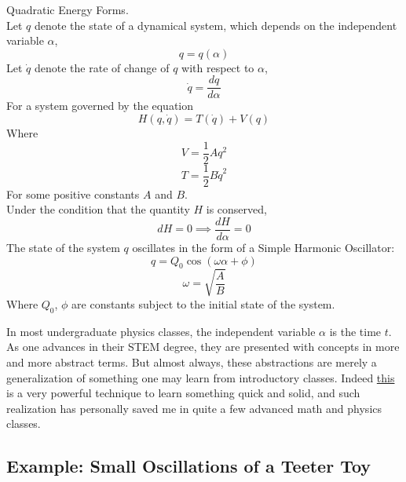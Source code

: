 \documentclass[11pt]{article}
\theoremstyle{gangnamstyle}{\newtheorem{definition}{Definition}[]}
\theoremstyle{gangnamstyle}{\newtheorem{example}{Example}[]}
\theoremstyle{gangnamstyle}{\newtheorem{problem}{Problem}[]}
\theoremstyle{gangnamstyle}{\newtheorem{warning}{Warning}[]}
\begin{document}
\begin{definition}
Quadratic Energy Forms. \\
Let $q$ denote the state of a dynamical system, which depends on the independent variable $\alpha$, 
\begin{equation}
q = q(\alpha)
\end{equation}
Let $\Dot{q}$ denote the rate of change of $q$ with respect to $\alpha$,
\begin{equation}
\Dot{q} = \frac{dq}{d\alpha}
\end{equation}
For a system governed by the equation
\begin{equation}
H(q, \Dot{q}) = T(\Dot{q}) + V(q)
\end{equation}
Where
\begin{equation}
V = \frac{1}{2} Aq^2
\end{equation}
\begin{equation}
T = \frac{1}{2} B\Dot{q}^2
\end{equation}
For some positive constants $A$ and $B$. \\
Under the condition that the quantity $H$ is conserved, 
\begin{equation}
dH = 0 \implies \frac{dH}{d\alpha} = 0
\end{equation}
The state of the system $q$ oscillates in the form of a Simple Harmonic Oscillator: 
\begin{equation}
q = Q_0\cos(\omega \alpha + \phi)
\end{equation}
\begin{equation}
\omega = \sqrt{\frac{A}{B}}
\end{equation}
Where $Q_0$, $\phi$ are constants subject to the initial state of the system.
\end{definition}
In most undergraduate physics classes, the independent variable $\alpha$ is the time $t$. \\
As one advances in their STEM degree, they are presented with concepts in more and more abstract terms. But almost always, these abstractions are merely a generalization of something one may learn from introductory classes. Indeed \href{https://lsa.umich.edu/technology-services/news-events/all-news/teaching-tip-of-the-week/three-activities-to-activate-prior-knowledge.html}{this} is a very powerful technique to learn something quick and solid, and such realization has personally saved me in quite a few advanced math and physics classes. 

\subsection{Example: Small Oscillations of a Teeter Toy}
\end{document}
